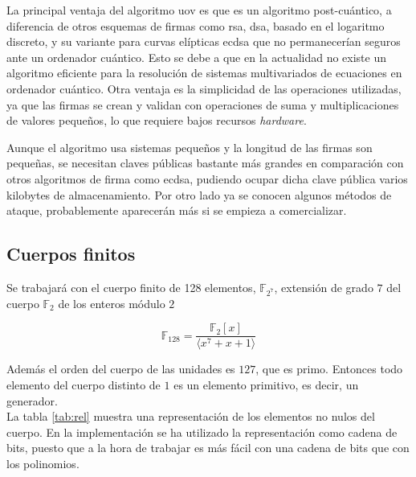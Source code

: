 La principal ventaja del algoritmo \acrshort{uov} es que es un algoritmo post-cuántico, a diferencia de otros esquemas de firmas como \acrshort{rsa}, \acrshort{dsa}, basado en el logaritmo discreto, y su variante para curvas elípticas \mbox{\acrshort{ecdsa}} que no permanecerían seguros ante un ordenador cuántico. Esto se debe a que en la actualidad no existe un algoritmo eficiente para la resolución de sistemas multivariados de ecuaciones  en ordenador cuántico. Otra ventaja es la simplicidad de las operaciones utilizadas, ya que las firmas se crean y validan con operaciones de suma y multiplicaciones de valores pequeños, lo que requiere bajos recursos \textit{hardware}. 

Aunque el algoritmo usa sistemas pequeños y la longitud de las firmas son pequeñas, se necesitan claves públicas bastante más grandes en comparación con otros algoritmos de firma como \mbox{\acrshort{ecdsa}}, pudiendo ocupar dicha clave pública varios kilobytes de almacenamiento. Por otro lado ya se conocen algunos métodos de ataque, probablemente aparecerán más si se empieza a comercializar.\\

\subsection{Cuerpos finitos}
Se trabajará con el cuerpo finito de 128 elementos, $\mathds{F}_{2^7}$, extensión de grado $7$ del cuerpo $\mathds{F}_2$ de los enteros módulo $2$
 
\begin{equation}
\mathds{F}_{128} = \frac{\mathds{F}_2[x]}{\langle x^7 + x + 1 \rangle}
\end{equation}

Además el orden del cuerpo de las unidades es $127$, que es primo. Entonces todo elemento del cuerpo distinto de $1$ es un elemento primitivo, es decir, un generador.\\

La tabla \ref{tab:rel} muestra una representación de los elementos no nulos del cuerpo. En la implementación se ha utilizado la representación como cadena de bits, puesto que a la hora de trabajar es más fácil con una cadena de bits que con los polinomios.


